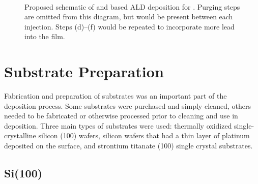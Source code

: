 \begin{figure}[tbp]
{	} 
	\hspace{1cm} 
   \\
   \caption[Illustration of Example \PTO{} ALD Cycle]%
   		{Proposed schematic of \TMHD{} and \TiOiPr{} based ALD deposition for \PTO{}. Purging steps %
		are omitted from this diagram, but would be present between each injection. Steps (d)--(f) would be %
		repeated to incorporate more lead into the film.}
   \label{fig:PTO-pathway}
\end{figure}



\section{Substrate Preparation}
\label{sec:SampFab-Substrates}

Fabrication and preparation of substrates was an important part of the deposition process. Some substrates were purchased and simply cleaned, others needed to be fabricated or otherwise processed prior to cleaning and use in deposition. Three main types of substrates were used: thermally oxidized single-crystalline silicon (100) wafers, silicon wafers that had a thin layer of platinum deposited on the surface, and strontium titanate (100) single crystal substrates. 

\subsection{Si(100)} \label{sec:Si}

